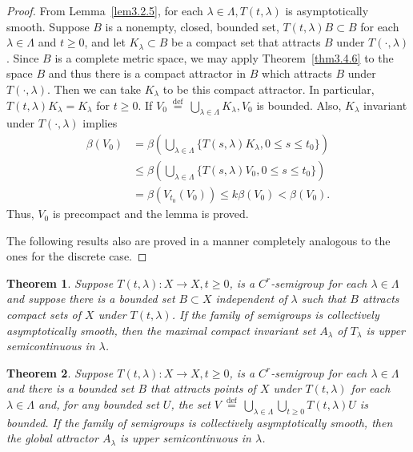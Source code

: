 \documentclass{surv-l}
\theoremstyle{plain}
\newtheorem{theorem}{Theorem}[section]
\theoremstyle{definition}
\numberwithin{equation}{section}
\numberwithin{figure}{chapter}
\begin{document}
\begin{proof} From Lemma~\ref{lem3.2.5}, for each $\lambda\in \Lambda,T(t,\lambda)$ is asymptotically smooth. Suppose $B$ is a nonempty, closed, bounded set, $T(t, \lambda)B\subset B$ for each $\lambda\in\Lambda$ and $t\geq 0$, and let $K_{\lambda}\subset B$ be a compact set that attracts $B$ under $T(\cdot, \lambda)$. Since $B$ is a complete metric space, we may apply Theorem~\ref{thm3.4.6} to the space $B$ and thus there is a compact attractor in $B$ which attracts $B$ under $T(\cdot, \lambda)$. Then we can take $K_{\lambda}$ to be this compact attractor. In particular, $T(t,\lambda)K_{\lambda}=K_{\lambda}$ for $t\geq 0$. If $V_{0}\ {\overset{\mathrm{def}}{=}}\ \bigcup_{\lambda\in\Lambda}K_{\lambda},V_{0}$ is bounded. Also, $K_{\lambda}$ invariant under $T(\cdot, \lambda)$ implies
\begin{align*}
\beta(V_{0})&=\beta\left(\bigcup_{\lambda\in\Lambda}\{T(s, \lambda)K_{\lambda}, 0\leq s\leq t_{0}\}\right)\\
&\leq\beta\left(\bigcup_{\lambda\in\Lambda}\{T(s, \lambda)V_{0},0\leq s\leq t_{0}\}\right)\\
&=\beta(V_{t_{0}}(V_{0}))\leq k\beta(V_{0})<\beta(V_{0}).
\end{align*}
Thus, $V_{0}$ is precompact and the lemma is proved.

The following results also are proved in a manner completely analogous to the ones for the discrete case.
\end{proof}

\begin{theorem}\label{thm3.5.2} Suppose $T(t,\lambda)\!:X\rightarrow X,t\geq 0$, is a $C^{r}$-semigroup for
each $\lambda \in\Lambda$ and suppose there is a bounded set $B\subset X$ independent of $\lambda$ such that $B$ attracts compact sets of $X$ under $T(t,\lambda)$. If the family of semigroups is collectively asymptotically smooth, then the maximal compact invariant set $A_{\lambda}$ of $T_{\lambda}$ is upper semicontinuous in $\lambda$.
\end{theorem}

\begin{theorem}\label{thm3.5.3}
Suppose $T(t,\lambda)\!:X\rightarrow X,t\geq 0$, is a $C^{r}$-semigroup for each $\lambda\in\Lambda$ and there is a bounded set $B$ that attracts points of $X$ under $T(t, \lambda)$ for each $\lambda \in\Lambda$ and, for any bounded set $U$, the set $V\ {\overset{\mathrm{def}}{=}}\ \bigcup_{\lambda\in\Lambda}\bigcup_{t\geq 0}T(t,\lambda)U$ is bounded. If the family of semigroups is collectively asymptotically smooth, then the global attractor $A_{\lambda}$ is upper semicontinuous in $\lambda$.
\end{theorem}
\end{document}
